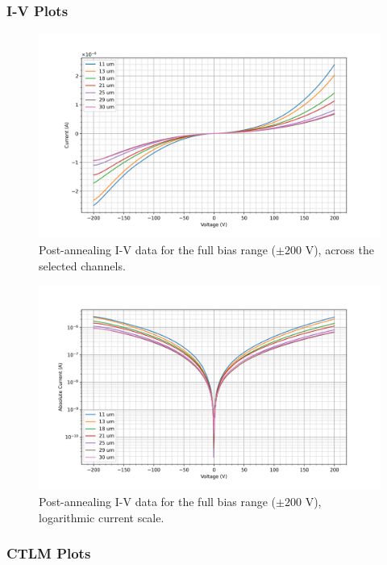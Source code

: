 \subsubsection{I-V Plots}
\begin{figure}[H]
    \centering
    \includegraphics[width=\textwidth]{Chapter3/Figs/Raster/Sample F 2022/Post-anneal/lin_scale.png}
    \caption{Post-annealing I-V data for the full bias range ($\pm200$ \si{\volt}), across the selected channels.}
    \label{fig:post-anneal-iv-lin-200}
\end{figure}
\begin{figure}[H]
    \centering
    \includegraphics[width=\textwidth]{Chapter3/Figs/Raster/Sample F 2022/Post-anneal/log_scale.png}
    \caption{Post-annealing I-V data for the full bias range ($\pm200$ \si{\volt}), logarithmic current scale.}
    \label{fig:post-anneal-iv-log-200}
\end{figure}

\subsubsection{CTLM Plots}

